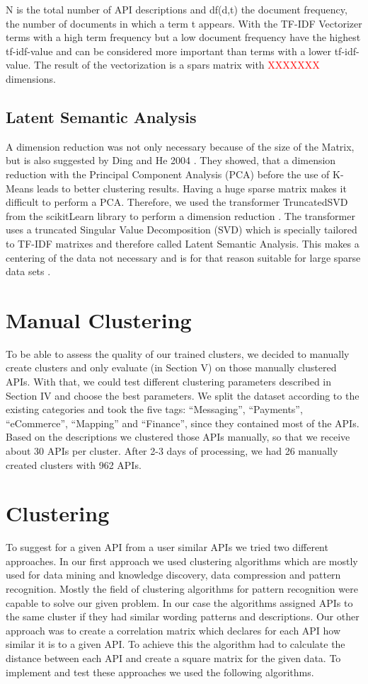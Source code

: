 \documentclass[a4paper]{IEEEtran}
\begin{document}
N is the total number of API descriptions and df(d,t) the document frequency, the number of documents in which a term t appears. 
With the TF-IDF Vectorizer terms with a high term frequency but a low document frequency have the highest tf-idf-value and can be considered more important than terms with a lower tf-idf-value. The result of the vectorization is a spars matrix with \textcolor{red} {XXXXXXX} dimensions.

\subsection{Latent Semantic Analysis}
A dimension reduction was not only necessary because of the size of the Matrix, but is also suggested by Ding and He 2004 \cite{ding2004k}. They showed, that a dimension reduction with the Principal Component Analysis (PCA) before the use of K-Means leads to better clustering  results. Having a huge sparse matrix makes it difficult to perform a PCA. Therefore, we used the transformer TruncatedSVD from the scikitLearn library to perform a dimension reduction \cite{scikit-learn}. The transformer uses a truncated Singular Value Decomposition (SVD) which is specially tailored to TF-IDF matrixes and therefore called Latent Semantic Analysis. This makes a centering of the data not necessary and is for that reason suitable for large sparse data sets \cite{albright2004taming}.

\section{Manual Clustering}
To be able to assess the quality of our trained clusters, we decided to manually create clusters and only evaluate (in Section V) on those manually clustered APIs. With that, we could test different clustering parameters described in Section IV and choose the best parameters. We split the dataset according to the existing categories and took the five tags: “Messaging”, “Payments”, “eCommerce”, “Mapping” and “Finance”, since they contained most of the APIs. Based on the descriptions we clustered those APIs manually, so that we receive about 30 APIs per cluster. After 2-3 days of processing, we had 26 manually created clusters with 962 APIs.

\section{Clustering}
To suggest for a given API from a user similar APIs we tried two different approaches. In our first approach we used clustering algorithms which are mostly used for data mining and knowledge discovery, data compression and pattern recognition. Mostly the field of clustering algorithms for pattern recognition were capable to solve our given problem. In our case the algorithms assigned APIs to the same cluster if they had similar wording patterns and descriptions. 
Our other approach was to create a correlation matrix which declares for each API how similar it is to a given API. To achieve this the algorithm had to calculate the distance between each API and create a square matrix for the given data.
To implement and test these approaches we used the following algorithms.
\end{document}
